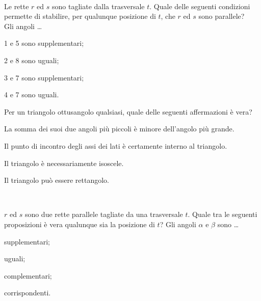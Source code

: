 \begin{multicols}{2}
\begin{esercizio}
\label{ese:3.112}
~\\
\noindent\begin{minipage}{0.6\textwidth}
Le rette $r$ ed $s$ sono tagliate dalla trasversale $t$. Quale delle 
seguenti condizioni permette di stabilire, per qualunque posizione di 
$t$, che $r$ ed $s$ sono parallele?\\
Gli angoli \ldots{}
\begin{enumeratea}
\item 1 e 5 sono supplementari;
\item 2 e 8 sono uguali;
\item 3 e 7 sono supplementari;
\item 4 e 7 sono uguali.
\end{enumeratea}
\end{minipage}\hfil
\begin{minipage}{0.4\textwidth}
\centering
\end{minipage}
\end{esercizio}

\begin{esercizio}
\label{ese:3.113}
Per un triangolo ottusangolo qualsiasi, quale delle seguenti 
affermazioni è vera?
\begin{enumeratea}
\item La somma dei suoi due angoli più piccoli è minore dell'angolo 
più grande.
\item Il punto di incontro degli assi dei lati è certamente interno 
al triangolo.
\item Il triangolo è necessariamente isoscele.
\item Il triangolo può essere rettangolo.
\end{enumeratea}
\end{esercizio}

\begin{esercizio}
\label{ese:3.114}
~\\
\noindent\begin{minipage}{0.65\textwidth}
$r$ ed $s$ sono due rette parallele tagliate da una trasversale $t$. 
Quale tra le seguenti proposizioni è vera qualunque sia la posizione 
di $t$?
Gli angoli $\alpha$ e $\beta$ sono \ldots{}
\begin{enumeratea}
\item supplementari;
\item uguali;
\item complementari;
\item corrispondenti.
\end{enumeratea}
\end{minipage}\hfil
\begin{minipage}{0.35\textwidth}
\centering
\end{minipage}
\end{esercizio}


\end{multicols}
